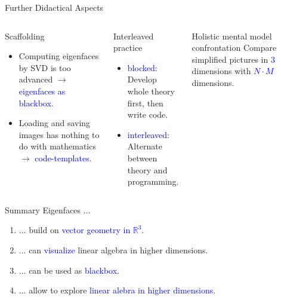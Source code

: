 \documentclass[10pt,aspectratio=169,usenames,dvipsnames]{beamer} %
\begin{document}
\begin{frame}[fragile]{Further Didactical Aspects}
	\begin{columns}[T,onlytextwidth]
		\column{\textwidth}
		\begin{block}{Scaffolding}
			\begin{itemize}
				\item Computing eigenfaces by SVD is too advanced $\rightarrow$ \textcolor{blue}{eigenfaces as blackbox}.
				\item Loading and saving images has nothing to do with mathematics $\rightarrow$ \textcolor{blue}{code-templates}.
			\end{itemize}
		\end{block}
		\begin{block}{Interleaved practice}
			\begin{itemize}
				\item \textcolor{blue}{blocked}: Develop whole theory first, then write code.
				\item \textcolor{blue}{interleaved}: Alternate between theory and programming.
			\end{itemize}
		\end{block}
		\begin{block}{Holistic mental model confrontation}
			Compare simplified pictures in \textcolor{blue}{3} dimensions with \textcolor{blue}{$N\cdot M$} dimensions.
		\end{block}
	\end{columns}
\end{frame}

\begin{frame}[fragile]{Summary}
	Eigenfaces ...\\
	\vspace{0.5cm} \pause
	\begin{enumerate}[1.] \setlength\itemsep{0.5cm}
		\item ... build on \textcolor{blue}{vector geometry in $\mathbb R^3$}. \pause
		\item ... can \textcolor{blue}{visualize} linear algebra in higher dimensions. \pause
		\item ... can be used as \textcolor{blue}{blackbox}. \pause
		\item ... allow to explore \textcolor{blue}{linear alebra in higher dimensions}.
	\end{enumerate}
\end{frame}
	
\end{document}
